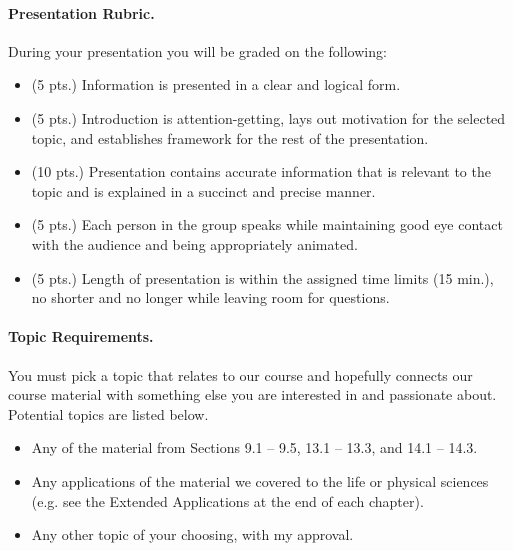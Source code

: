 \documentclass{article}
\begin{document}
\paragraph*{Presentation Rubric.} During your presentation you will be graded on the following:
\begin{itemize}
\item	(5 pts.) Information is presented in a clear and logical form.
\item	(5 pts.) Introduction is attention-getting, lays out motivation for the selected topic, and establishes framework for the rest of the presentation.
\item (10 pts.) Presentation contains accurate information that is relevant to the topic and is explained in a succinct and precise manner.
\item	(5 pts.) Each person in the group speaks while maintaining good eye contact with the audience and being appropriately animated. 
\item	(5 pts.) Length of presentation is within the assigned time limits (15 min.), no shorter and no longer while leaving room for questions. 
\end{itemize}

\paragraph*{Topic Requirements.} You must pick a topic that relates to our course and hopefully connects our course material with something else you are interested in and passionate about. Potential topics are listed below.
\begin{itemize}
\item	Any of the material from Sections 9.1 -- 9.5, 13.1 -- 13.3, and 14.1 -- 14.3.
\item	Any applications of the material we covered to the life or physical sciences (e.g. see the Extended Applications at the end of each chapter).
\item	Any other topic of your choosing, with my approval. 
\end{itemize}
\end{document}
